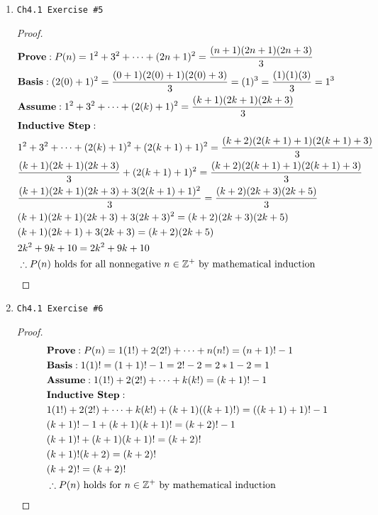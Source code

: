 \documentclass[11pt]{article}
\begin{document}
\begin{enumerate}
    \item \begin{verbatim}Ch4.1 Exercise #5\end{verbatim}
        \begin{proof}
            \begin{align*}
                &\textbf{Prove}: P(n) = 1^2 + 3^2 + \dots + (2n+1)^2 = \frac{(n+1)(2n+1)(2n+3)}{3}\\
                &\textbf{Basis}: (2(0)+1)^2 = \frac{(0+1)(2(0)+1)(2(0)+3)}{3} =  (1)^3 = \frac{(1)(1)(3)}{3} = 1^3 \\
                &\textbf{Assume}: 1^2 + 3^2 + \dots + (2(k)+1)^2 = \frac{(k+1)(2k+1)(2k+3)}{3} \\
                &\textbf{Inductive Step}:\\ 
                & 1^2 + 3^2 + \dots + (2(k)+1)^2 + (2(k+1)+1)^2 = \frac{(k+2)(2(k+1)+1)(2(k+1)+3)}{3} \\
                &\frac{(k+1)(2k+1)(2k+3)}{3} + (2(k+1)+1)^2 = \frac{(k+2)(2(k+1)+1)(2(k+1)+3)}{3} \\
                &\frac{(k+1)(2k+1)(2k+3)+3(2(k+1)+1)^2}{3} = \frac{(k+2)(2k+3)(2k+5)}{3} \\
                &(k+1)(2k+1)(2k+3)+3(2k+3)^2 = (k+2)(2k+3)(2k+5) \\
                &(k+1)(2k+1)+3(2k+3) = (k+2)(2k+5) \\
                &2k^2+9k+10=2k^2+9k+10 \\
                &\therefore P(n) \text{ holds for all nonnegative } n \in \mathbb{Z}^+ \text{ by mathematical induction} \qedhere
            \end{align*}
        \end{proof}

    \item \begin{verbatim}Ch4.1 Exercise #6\end{verbatim}
        \begin{proof}
            \begin{align*}
                & \textbf{Prove}: P(n) = 1(1!) + 2(2!) + \dots + n(n!) = (n+1)! - 1 \\
                & \textbf{Basis}: 1(1)! = (1+1)! - 1 = 2! - 2 = 2*1 - 2 = 1 \\
                & \textbf{Assume}:  1(1!) + 2(2!) + \dots + k(k!) = (k+1)! - 1 \\
                & \textbf{Inductive Step}: \\
                & 1(1!) + 2(2!) + \dots + k(k!) + (k+1)((k+1)!) = ((k+1)+1)! - 1 \\
                & (k+1)! - 1 + (k+1)(k+1)! = (k+2)! - 1 \\
                & (k+1)! + (k+1)(k+1)! = (k+2)! \\
                & (k+1)!(k+2) = (k+2)! \\
                & (k+2)! = (k+2)! \\
                & \therefore P(n) \text{ holds for }n \in \mathbb{Z}^+ \text{ by mathematical induction} \qedhere
            \end{align*}
        \end{proof}
    

\end{enumerate}
\end{document}
